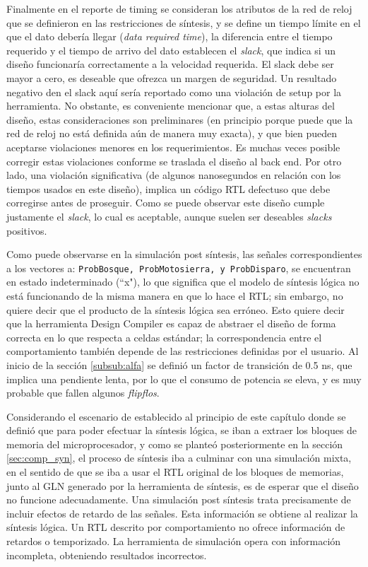 Finalmente en el reporte de timing se consideran los atributos de la red de reloj que se definieron en las restricciones de síntesis, y se define un tiempo límite en el que el dato debería llegar (\textit{data required time}), la diferencia entre el tiempo requerido y el tiempo de arrivo del dato establecen el \textit{slack}, que indica si un diseño funcionaría correctamente a la velocidad requerida. El slack debe ser mayor a cero,  es deseable que ofrezca un margen de seguridad. Un resultado negativo den el slack aquí sería reportado como una violación de setup por la herramienta. No obstante, es conveniente mencionar que, a estas alturas del diseño, estas consideraciones son preliminares (en principio porque puede que la red de reloj no está definida aún de manera muy exacta), y que bien pueden aceptarse violaciones menores en los requerimientos. Es muchas veces posible corregir estas violaciones conforme se traslada el diseño al back end. Por otro lado, una violación significativa (de algunos nanosegundos en relación con los tiempos usados en este diseño), implica un código RTL defectuso que debe corregirse antes de proseguir. Como se puede observar este diseño cumple justamente el \textit{slack}, lo cual es aceptable, aunque suelen ser deseables \textit{slacks} positivos.

Como puede observarse en la simulación post síntesis, las señales correspondientes a los vectores a:
\texttt{ProbBosque, ProbMotosierra, y ProbDisparo}, se encuentran en estado indeterminado (``x"), lo que significa que el modelo de síntesis lógica no está funcionando de la misma manera en que lo hace el RTL; sin embargo, no quiere decir que el producto de la síntesis lógica sea erróneo. Esto quiere decir que la herramienta Design Compiler es capaz de abstraer el diseño de forma correcta en lo que respecta a celdas estándar; la correspondencia entre el comportamiento también depende de las restricciones definidas por el usuario. Al inicio de la sección \ref{subsub:alfa} se definió un factor de transición de 0.5 ns, que implica una pendiente lenta, por lo que el consumo de potencia se eleva, y es muy probable que fallen algunos \textit{flipflos}.

Considerando el escenario de establecido al principio de este capítulo donde se definió que para poder efectuar la síntesis lógica, se iban a extraer los bloques de memoria del microprocesador, y como se planteó posteriormente en la sección \ref{sec:comp_syn}, el proceso de síntesis iba a culminar con una simulación mixta, en el sentido de que se iba a usar el RTL original de los bloques de memorias, junto al GLN generado por la herramienta de síntesis, es de esperar que el diseño no funcione adecuadamente. Una simulación post síntesis trata precisamente de incluir efectos de retardo de las señales. Esta información se obtiene al realizar la síntesis lógica. Un RTL descrito por comportamiento no ofrece información de retardos o temporizado. La herramienta de simulación opera con información incompleta, obteniendo resultados incorrectos.

